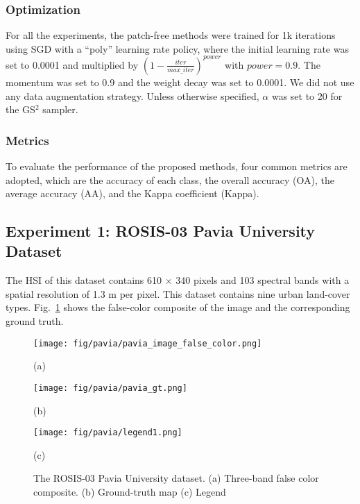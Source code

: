 \documentclass[journal]{IEEEtran}
\begin{document}
\subsubsection{\textbf{Optimization}}
For all the experiments, the patch-free methods were trained for 1k iterations using SGD with a ``poly'' learning rate policy, where the initial learning rate was set to 0.0001 and multiplied by $(1 - \frac{iter}{max\_iter})^{power}$ with $power = 0.9$.
The momentum was set to 0.9 and the weight decay was set to 0.0001.
We did not use any data augmentation strategy.
Unless otherwise specified, $\alpha$ was set to 20 for the GS$^2$ sampler.

\subsubsection{\textbf{Metrics}}
To evaluate the performance of the proposed methods, four common metrics are adopted, which are the accuracy of each class, the overall accuracy (OA),  the average
accuracy (AA), and the Kappa coefficient (Kappa).




\subsection{Experiment 1: ROSIS-03 Pavia University Dataset}
\label{sec:exp1}

The HSI of this dataset contains 610 $\times$ 340 pixels and 103 spectral bands with a spatial resolution of 1.3 m per pixel.
This dataset contains nine urban land-cover types.
Fig.~\ref{fig:pavia_data} shows the false-color composite of the image and the corresponding ground truth.

\begin{figure}[htb]
  \begin{minipage}[b]{.30\linewidth}
    \centering
    \texttt{[image: fig/pavia/pavia\_image\_false\_color.png]}
    \centerline{(a)}
  \end{minipage}
  \hfill
  \begin{minipage}[b]{0.30\linewidth}
    \centering
    \texttt{[image: fig/pavia/pavia\_gt.png]}
    \centerline{(b)}
  \end{minipage}
  \hfill
  \begin{minipage}[b]{0.30\linewidth}
    \centering
    \texttt{[image: fig/pavia/legend1.png]}
    \centerline{(c)}
  \end{minipage}
  \caption{The ROSIS-03 Pavia University dataset.
    (a) Three-band false color composite.
    (b) Ground-truth map
    (c) Legend}
  \label{fig:pavia_data}
\end{figure}
\end{document}
